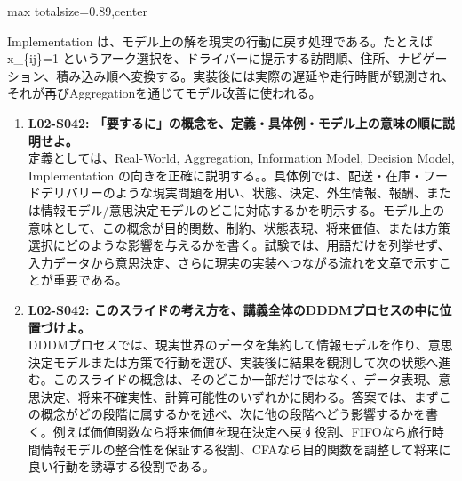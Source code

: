 \begin{minipage}[t]{0.58\textwidth}
\begin{adjustbox}{max totalsize={\textwidth}{0.89\textheight},center}
\begin{minipage}{\textwidth}
Implementation は、モデル上の解を現実の行動に戻す処理である。たとえば x\_\{ij\}=1 というアーク選択を、ドライバーに提示する訪問順、住所、ナビゲーション、積み込み順へ変換する。実装後には実際の遅延や走行時間が観測され、それが再びAggregationを通じてモデル改善に使われる。\par{}\begin{enumerate}\item \textbf{L02-S042: 「要するに」の概念を、定義・具体例・モデル上の意味の順に説明せよ。}\\定義としては、Real-World, Aggregation, Information Model, Decision Model, Implementation の向きを正確に説明する。。具体例では、配送・在庫・フードデリバリーのような現実問題を用い、状態、決定、外生情報、報酬、または情報モデル/意思決定モデルのどこに対応するかを明示する。モデル上の意味として、この概念が目的関数、制約、状態表現、将来価値、または方策選択にどのような影響を与えるかを書く。試験では、用語だけを列挙せず、入力データから意思決定、さらに現実の実装へつながる流れを文章で示すことが重要である。\item \textbf{L02-S042: このスライドの考え方を、講義全体のDDDMプロセスの中に位置づけよ。}\\DDDMプロセスでは、現実世界のデータを集約して情報モデルを作り、意思決定モデルまたは方策で行動を選び、実装後に結果を観測して次の状態へ進む。このスライドの概念は、そのどこか一部だけではなく、データ表現、意思決定、将来不確実性、計算可能性のいずれかに関わる。答案では、まずこの概念がどの段階に属するかを述べ、次に他の段階へどう影響するかを書く。例えば価値関数なら将来価値を現在決定へ戻す役割、FIFOなら旅行時間情報モデルの整合性を保証する役割、CFAなら目的関数を調整して将来に良い行動を誘導する役割である。\end{enumerate}
\end{minipage}
\end{adjustbox}
\end{minipage}


